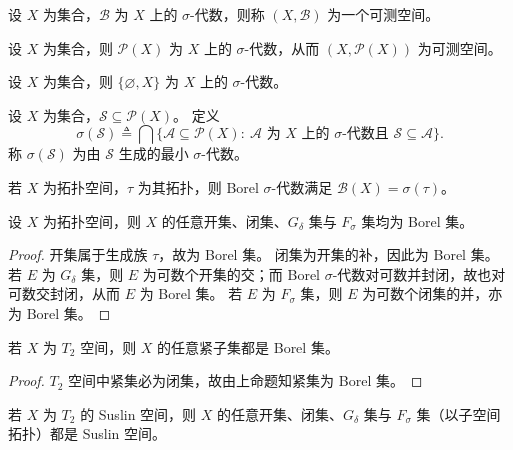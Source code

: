 \documentclass[lang=cn,a4paper,newtx,figureplace=section,tableplace=section]{elegantbook}
\begin{document}
 \begin{definition}[可测空间]
   设 $X$ 为集合，$\mathcal{B}$ 为 $X$ 上的 $\sigma$-代数，则称 $(X,\mathcal{B})$ 为一个可测空间。
 \end{definition}

 \begin{example}
   设 $X$ 为集合，则 $\mathcal{P}(X)$ 为 $X$ 上的 $\sigma$-代数，从而 $(X,\mathcal{P}(X))$ 为可测空间。
 \end{example}

 \begin{example}
   设 $X$ 为集合，则 $\{\varnothing,X\}$ 为 $X$ 上的 $\sigma$-代数。
 \end{example}

\begin{definition}
  设 $X$ 为集合，$\mathcal{S}\subseteq\mathcal{P}(X)$。
  定义
  \[
    \sigma(\mathcal{S})\triangleq\bigcap\{\mathcal{A}\subseteq\mathcal{P}(X):\ \mathcal{A}\text{ 为 }X\text{ 上的 }\sigma\text{-代数且 }\mathcal{S}\subseteq\mathcal{A}\}.
  \]
  称 $\sigma(\mathcal{S})$ 为由 $\mathcal{S}$ 生成的最小 $\sigma$-代数。
\end{definition}

\begin{remark}
  若 $X$ 为拓扑空间，$\tau$ 为其拓扑，则 Borel $\sigma$-代数满足 $\mathcal{B}(X)=\sigma(\tau)$。
\end{remark}

\begin{proposition}
  设 $X$ 为拓扑空间，则 $X$ 的任意开集、闭集、$G_\delta$ 集与 $F_\sigma$ 集均为 Borel 集。
\end{proposition}

\begin{proof}
  开集属于生成族 $\tau$，故为 Borel 集。
  闭集为开集的补，因此为 Borel 集。
  若 $E$ 为 $G_\delta$ 集，则 $E$ 为可数个开集的交；而 Borel $\sigma$-代数对可数并封闭，故也对可数交封闭，从而 $E$ 为 Borel 集。
  若 $E$ 为 $F_\sigma$ 集，则 $E$ 为可数个闭集的并，亦为 Borel 集。
\end{proof}

\begin{proposition}
  若 $X$ 为 $T_2$ 空间，则 $X$ 的任意紧子集都是 Borel 集。
\end{proposition}

\begin{proof}
  $T_2$ 空间中紧集必为闭集，故由上命题知紧集为 Borel 集。
\end{proof}

\begin{corollary}
  若 $X$ 为 $T_2$ 的 Suslin 空间，则 $X$ 的任意开集、闭集、$G_\delta$ 集与 $F_\sigma$ 集（以子空间拓扑）都是 Suslin 空间。
\end{corollary}
\end{document}
